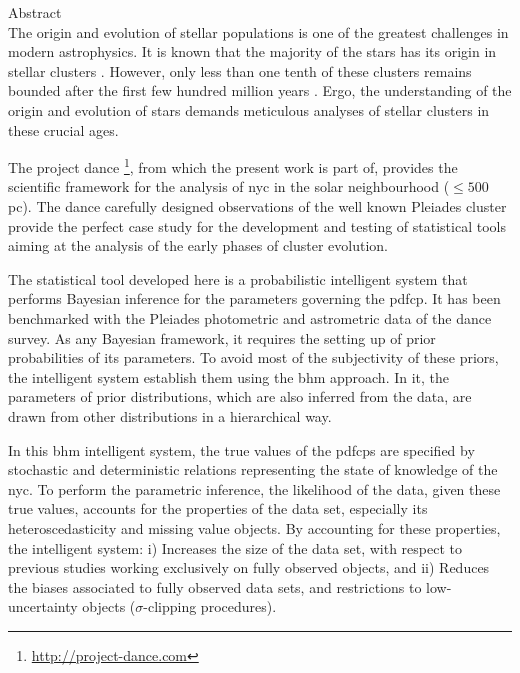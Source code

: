 

{\LARGE Abstract}\\

The origin and evolution of stellar populations is one of the greatest challenges in modern astrophysics. It is known that the majority of the stars has its origin in stellar clusters \citep{2000AJ....120.3139C, 2003AJ....126.1916P,2003ARA&A..41...57L}. However, only less than one tenth of these clusters remains bounded after the first few hundred million years \citep{2003ARA&A..41...57L}. Ergo, the understanding of the origin and evolution of stars demands meticulous analyses of stellar clusters in these crucial ages.

The project \gls{dance} \footnote{\url{http://project-dance.com}}, from which the present work is part of, provides the scientific framework for the analysis of \gls{nyc} in the solar neighbourhood ($\leq 500$ pc). The \gls{dance} carefully designed observations of the well known Pleiades cluster provide the perfect case study for the development and testing of statistical tools aiming at the analysis of the early phases of cluster evolution.

The statistical tool developed here is a probabilistic intelligent system that performs Bayesian inference for the parameters governing the \gls{pdfcp}. It has been benchmarked with the Pleiades photometric and astrometric data of the \gls{dance} survey. As any Bayesian framework, it requires the setting up of prior probabilities of its parameters. To avoid most of the subjectivity of these priors, the intelligent system establish them using the \gls{bhm} approach. In it, the parameters of prior distributions, which are also inferred from the data, are drawn from other distributions in a hierarchical way. 

In this \gls{bhm} intelligent system, the true values of the \glspl{pdfcp} are specified by stochastic and deterministic relations representing the state of knowledge of the \gls{nyc}. To perform the parametric inference, the likelihood of the data, given these true values, accounts for the properties of the data set, especially its heteroscedasticity and missing value objects. By accounting for these properties, the intelligent system: i) Increases the size of the data set, with respect to previous studies working exclusively on fully observed objects, and ii) Reduces the biases associated to fully observed data sets, and restrictions to low-uncertainty objects ($\sigma$-clipping procedures).

